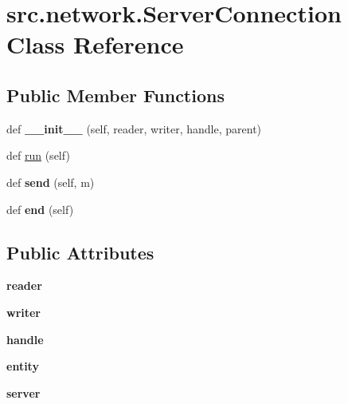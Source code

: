 \hypertarget{classsrc_1_1network_1_1_server_connection}{}\section{src.\+network.\+Server\+Connection Class Reference}
\label{classsrc_1_1network_1_1_server_connection}
\subsection*{Public Member Functions}
\begin{DoxyCompactItemize}
\item 
\hypertarget{classsrc_1_1network_1_1_server_connection_aa9cb8731fc189dea188b7414f9af919d}{}\label{classsrc_1_1network_1_1_server_connection_aa9cb8731fc189dea188b7414f9af919d} 
def {\bfseries \+\_\+\+\_\+init\+\_\+\+\_\+} (self, reader, writer, handle, parent)
\item 
def \hyperlink{classsrc_1_1network_1_1_server_connection_a90815003d240ea16f574c3bb718c2fe2}{run} (self)
\item 
\hypertarget{classsrc_1_1network_1_1_server_connection_a97bdb63ff84370566329822eed5067d0}{}\label{classsrc_1_1network_1_1_server_connection_a97bdb63ff84370566329822eed5067d0} 
def {\bfseries send} (self, m)
\item 
\hypertarget{classsrc_1_1network_1_1_server_connection_a6a3b4cb4def11f7d5f8f2e154479248b}{}\label{classsrc_1_1network_1_1_server_connection_a6a3b4cb4def11f7d5f8f2e154479248b} 
def {\bfseries end} (self)
\end{DoxyCompactItemize}
\subsection*{Public Attributes}
\begin{DoxyCompactItemize}
\item 
\hypertarget{classsrc_1_1network_1_1_server_connection_a4bd50fbdebf2a26a395f6f5315fb3405}{}\label{classsrc_1_1network_1_1_server_connection_a4bd50fbdebf2a26a395f6f5315fb3405} 
{\bfseries reader}
\item 
\hypertarget{classsrc_1_1network_1_1_server_connection_aef8c4d5e35e0113fd7c75e249e469fb9}{}\label{classsrc_1_1network_1_1_server_connection_aef8c4d5e35e0113fd7c75e249e469fb9} 
{\bfseries writer}
\item 
\hypertarget{classsrc_1_1network_1_1_server_connection_a7f3534db8f1973fd35c15680c03e5c4d}{}\label{classsrc_1_1network_1_1_server_connection_a7f3534db8f1973fd35c15680c03e5c4d} 
{\bfseries handle}
\item 
\hypertarget{classsrc_1_1network_1_1_server_connection_a2422ae5d77f824318d3d90a00426bdea}{}\label{classsrc_1_1network_1_1_server_connection_a2422ae5d77f824318d3d90a00426bdea} 
{\bfseries entity}
\item 
\hypertarget{classsrc_1_1network_1_1_server_connection_acc1fdbe1f95a27cda852cb08255d5811}{}\label{classsrc_1_1network_1_1_server_connection_acc1fdbe1f95a27cda852cb08255d5811} 
{\bfseries server}
\end{DoxyCompactItemize}


